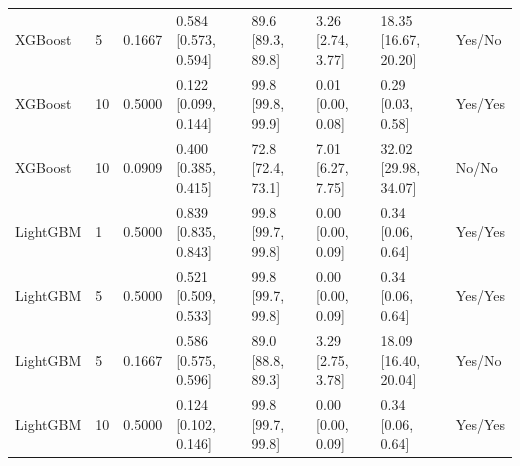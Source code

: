 \begin{longtable}{llllllll}
XGBoost & 5 & 0.1667 & \shortstack{{0.584} \\ {[0.573, 0.594]}} & \shortstack{{89.6} \\ {[89.3, 89.8]}} & \shortstack{{3.26} \\ {[2.74, 3.77]}} & \shortstack{{18.35} \\ {[16.67, 20.20]}} & Yes/No \\
XGBoost & 10 & 0.5000 & \shortstack{{0.122} \\ {[0.099, 0.144]}} & \shortstack{{99.8} \\ {[99.8, 99.9]}} & \shortstack{{0.01} \\ {[0.00, 0.08]}} & \shortstack{{0.29} \\ {[0.03, 0.58]}} & Yes/Yes \\
XGBoost & 10 & 0.0909 & \shortstack{{0.400} \\ {[0.385, 0.415]}} & \shortstack{{72.8} \\ {[72.4, 73.1]}} & \shortstack{{7.01} \\ {[6.27, 7.75]}} & \shortstack{{32.02} \\ {[29.98, 34.07]}} & No/No \\
LightGBM & 1 & 0.5000 & \shortstack{{0.839} \\ {[0.835, 0.843]}} & \shortstack{{99.8} \\ {[99.7, 99.8]}} & \shortstack{{0.00} \\ {[0.00, 0.09]}} & \shortstack{{0.34} \\ {[0.06, 0.64]}} & Yes/Yes \\
LightGBM & 5 & 0.5000 & \shortstack{{0.521} \\ {[0.509, 0.533]}} & \shortstack{{99.8} \\ {[99.7, 99.8]}} & \shortstack{{0.00} \\ {[0.00, 0.09]}} & \shortstack{{0.34} \\ {[0.06, 0.64]}} & Yes/Yes \\
LightGBM & 5 & 0.1667 & \shortstack{{0.586} \\ {[0.575, 0.596]}} & \shortstack{{89.0} \\ {[88.8, 89.3]}} & \shortstack{{3.29} \\ {[2.75, 3.78]}} & \shortstack{{18.09} \\ {[16.40, 20.04]}} & Yes/No \\
LightGBM & 10 & 0.5000 & \shortstack{{0.124} \\ {[0.102, 0.146]}} & \shortstack{{99.8} \\ {[99.7, 99.8]}} & \shortstack{{0.00} \\ {[0.00, 0.09]}} & \shortstack{{0.34} \\ {[0.06, 0.64]}} & Yes/Yes \\

\end{longtable}
